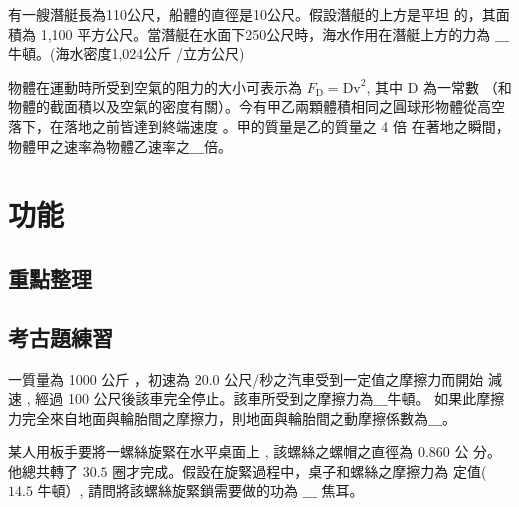 \documentclass[cn,10pt,math=newtx,chinesefont=founder]{../elegantbook}
\begin{document}
\begin{example}
    有一艘潛艇長為110公尺，船體的直徑是10公尺。假設潛艇的上方是平坦 的，其面積為 1,100 平方公尺。當潛艇在水面下250公尺時，海水作用在潛艇上方的力為 $\_\_\_$ 牛頓。(海水密度1,024公斤 /立方公尺)
\end{example}
\begin{solution}

\end{solution}
\vspace{6cm}
\begin{example}
    物體在運動時所受到空氣的阻力的大小可表示為 $F_{\mathrm{D}}=\mathrm{Dv}^{2}$, 其中 $\mathrm{D}$ 為一常數 （和物體的截面積以及空氣的密度有關）。今有甲乙兩顆體積相同之圓球形物體從高空落下，在落地之前皆達到終端速度 。甲的質量是乙的質量之 4 倍 在著地之瞬間，物體甲之速率為物體乙速率之$\_\_\_$倍。
\end{example}
\begin{solution}
\end{solution}
\newpage


\section{功能}
\subsection{重點整理}
\newpage
\subsection{考古題練習}
\begin{example}
    一質量為 1000 公斤 ，初速為 $20.0$ 公尺/秒之汽車受到一定值之摩擦力而開始 減速 , 
    經過 100 公尺後該車完全停止。該車所受到之摩擦力為$\_\_\_$牛頓。 如果此摩擦力完全來自地面與輪胎間之摩擦力，則地面與輪胎間之動摩擦係數為$\_\_\_$。
\end{example}
\begin{solution}
    
\end{solution}
\vspace{6cm}
\begin{example}
    某人用板手要將一螺絲旋緊在水平桌面上 , 該螺絲之螺帽之直徑為 $0.860$ 公 分。他總共轉了 $30.5$ 圈才完成。假設在旋緊過程中，桌子和螺絲之摩擦力為 定值( $14.5$ 牛頓）, 請問將該螺絲旋緊鎖需要做的功為 $\_\_\_$ 焦耳。
\end{example}
\begin{solution}

\end{solution}
\vspace{6cm}
\end{document}
